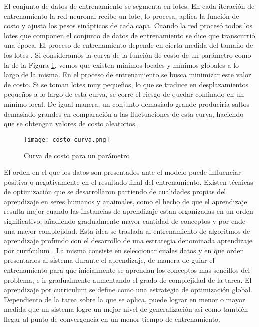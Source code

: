 El conjunto de datos de entrenamiento se segmenta en lotes. En cada iteración de entrenamiento la red neuronal recibe un lote, lo procesa, aplica la función de costo y ajusta los pesos sinápticos de cada capa. Cuando la red procesó todos los lotes que componen el conjunto de datos de entrenamiento se dice que transcurrió una época. El proceso de entrenamiento depende en cierta medida del tamaño de los lotes \cite{franchute}. Si consideramos la curva de la función de costo de un parámetro como la de la Figura \ref{fig:costo_curva}, vemos que existen mínimos locales y mínimos globales a lo largo de la misma. En el proceso de entrenamiento se busca minimizar este valor de costo. Si se toman lotes muy pequeños, lo que se traduce en desplazamientos pequeños a lo largo de esta curva, se corre el riesgo de quedar confinado en un mínimo local. De igual manera, un conjunto demasiado grande produciría saltos demasiado grandes en comparación a las fluctuaciones de esta curva, haciendo que se obtengan valores de costo aleatorios. 

\begin{figure}[H]
  \centering{}
  \texttt{[image: costo\_curva.png]}
  \caption{Curva de costo para un parámetro}
  \label{fig:costo_curva}
\end{figure}

El orden en el que los datos son presentados ante el modelo puede influenciar positiva o negativamente en el resultado final del entrenamiento. Existen técnicas de optimización que se desarrollaron partiendo de cualidades propias del aprendizaje en seres humanos y anaimales, como el hecho de que el aprendizaje resulta mejor cuando las instancias de aprendizaje estan organizadas en un orden significativo, añadiendo gradualmente mayor cantidad de conceptos y por ende una mayor complejidad. Esta idea se traslada al entrenamiento de algoritmos de aprendizaje profundo con el desarrollo de una estrategia denominada aprendizaje por currículum \cite{cv}. La misma consiste en seleccionar cuales datos y en que orden presentarlos al sistema durante el aprendizaje, de manera de guiar el entrenamiento para que inicialmente se aprendan los conceptos mas sencillos del problema, e ir gradualmente aumentando el grado de complejidad de la tarea. El aprendizaje por curriculum se define como una estrategia de optimización global. Dependiento de la tarea sobre la que se aplica, puede lograr en menor o mayor medida que un sistema logre un mejor nivel de generalización asi como también llegar al punto de convergencia en un menor tiempo de entrenamiento.  


